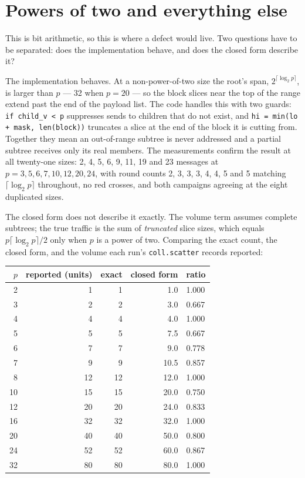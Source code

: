 \documentclass[11pt]{article}
\begin{document}
\section{Powers of two and everything else}

This is bit arithmetic, so this is where a defect would live. Two questions have to be separated:
does the implementation behave, and does the closed form describe it?

The implementation behaves. At a non-power-of-two size the root's span,
$2^{\lceil\log_2 p\rceil}$, is larger than $p$ --- 32 when $p=20$ --- so the block slices near the
top of the range extend past the end of the payload list. The code handles this with two guards:
\texttt{if child\_v < p} suppresses sends to children that do not exist, and
\texttt{hi = min(lo + mask, len(block))} truncates a slice at the end of the block it is cutting
from. Together they mean an out-of-range subtree is never addressed and a partial subtree receives
only its real members. The measurements confirm the result at all twenty-one sizes: 2, 4, 5, 6, 9,
11, 19 and 23 messages at $p = 3, 5, 6, 7, 10, 12, 20, 24$, with round counts 2, 3, 3, 3, 4, 4, 5
and 5 matching $\lceil\log_2 p\rceil$ throughout, no red crosses, and both campaigns agreeing at
the eight duplicated sizes.

The closed form does not describe it exactly. The volume term assumes complete subtrees; the true
traffic is the sum of \emph{truncated} slice sizes, which equals $p\lceil\log_2 p\rceil/2$ only
when $p$ is a power of two. Comparing the exact count, the closed form, and the volume each run's
\texttt{coll.scatter} records reported:

\begin{center}\footnotesize
\begin{tabular}{@{}rrrrl@{}}
\toprule
$p$ & reported (units) & exact & closed form & ratio \\
\midrule
 2 &  1 &  1 &  1.0 & 1.000 \\
 3 &  2 &  2 &  3.0 & 0.667 \\
 4 &  4 &  4 &  4.0 & 1.000 \\
 5 &  5 &  5 &  7.5 & 0.667 \\
 6 &  7 &  7 &  9.0 & 0.778 \\
 7 &  9 &  9 & 10.5 & 0.857 \\
 8 & 12 & 12 & 12.0 & 1.000 \\
10 & 15 & 15 & 20.0 & 0.750 \\
12 & 20 & 20 & 24.0 & 0.833 \\
16 & 32 & 32 & 32.0 & 1.000 \\
20 & 40 & 40 & 50.0 & 0.800 \\
24 & 52 & 52 & 60.0 & 0.867 \\
32 & 80 & 80 & 80.0 & 1.000 \\
\bottomrule
\end{tabular}\normalsize
\end{center}
\end{document}
